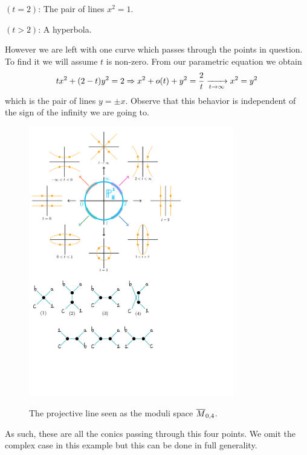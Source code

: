 \documentclass[12pt]{memoir}
\begin{document}
\begin{Ex}
\begin{itemize}
\begin{multicols}{2}
        \item $(t=2)$: The pair of lines $x^2=1$.
        \item $(t>2)$: A hyperbola.
        \end{multicols}
    \end{itemize}
    However we are left with one curve which passes through the points in question. To find it we will assume $t$ is non-zero. From our parametric equation we obtain 
    $$tx^2+(2-t)y^2=2\Rightarrow x^2+o(t)+y^2=\frac{2}{t}\xrightarrow[t\to\infty]{}x^2=y^2$$
    which is the pair of lines $y=\pm x$. Observe that this behavior is independent of the sign of the infinity we are going to. 
    \begin{figure}[h!]
        \centering
        \includegraphics[width=0.8\textwidth, trim= 0.25cm 13.1cm 5.25cm 0.5cm,clip]{figs/fig2Intro.pdf}
        \label{fig2intro}
        \caption{The projective line seen as the moduli space $\overline M_{0,4}$.}
    \end{figure}
    As such, these are all the conics passing through this four points. We omit the complex case in this example but this can be done in full generality.
\end{Ex}
   
\end{document}
